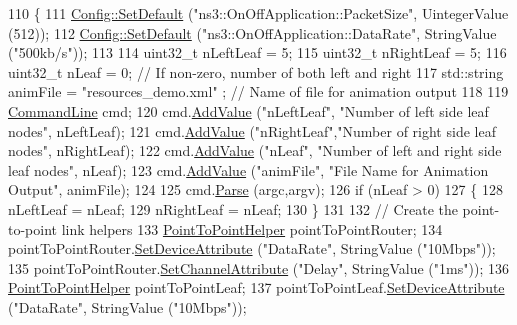 \begin{DoxyCode}
110 \{
111   \hyperlink{group__config_ga2e7882df849d8ba4aaad31c934c40c06}{Config::SetDefault} (\textcolor{stringliteral}{"ns3::OnOffApplication::PacketSize"}, UintegerValue (512));
112   \hyperlink{group__config_ga2e7882df849d8ba4aaad31c934c40c06}{Config::SetDefault} (\textcolor{stringliteral}{"ns3::OnOffApplication::DataRate"}, StringValue (\textcolor{stringliteral}{"500kb/s"}));
113 
114   uint32\_t    nLeftLeaf = 5;
115   uint32\_t    nRightLeaf = 5;
116   uint32\_t    nLeaf = 0; \textcolor{comment}{// If non-zero, number of both left and right}
117   std::string animFile = \textcolor{stringliteral}{"resources\_demo.xml"} ;  \textcolor{comment}{// Name of file for animation output}
118 
119   \hyperlink{classns3_1_1CommandLine}{CommandLine} cmd;
120   cmd.\hyperlink{classns3_1_1CommandLine_addcfb546c7ad4c8bd0965654d55beb8e}{AddValue} (\textcolor{stringliteral}{"nLeftLeaf"}, \textcolor{stringliteral}{"Number of left side leaf nodes"}, nLeftLeaf);
121   cmd.\hyperlink{classns3_1_1CommandLine_addcfb546c7ad4c8bd0965654d55beb8e}{AddValue} (\textcolor{stringliteral}{"nRightLeaf"},\textcolor{stringliteral}{"Number of right side leaf nodes"}, nRightLeaf);
122   cmd.\hyperlink{classns3_1_1CommandLine_addcfb546c7ad4c8bd0965654d55beb8e}{AddValue} (\textcolor{stringliteral}{"nLeaf"},     \textcolor{stringliteral}{"Number of left and right side leaf nodes"}, nLeaf);
123   cmd.\hyperlink{classns3_1_1CommandLine_addcfb546c7ad4c8bd0965654d55beb8e}{AddValue} (\textcolor{stringliteral}{"animFile"},  \textcolor{stringliteral}{"File Name for Animation Output"}, animFile);
124 
125   cmd.\hyperlink{classns3_1_1CommandLine_a5c10b85b3207e5ecb48d907966923156}{Parse} (argc,argv);
126   \textcolor{keywordflow}{if} (nLeaf > 0)
127     \{
128       nLeftLeaf = nLeaf;
129       nRightLeaf = nLeaf;
130     \}
131 
132   \textcolor{comment}{// Create the point-to-point link helpers}
133   \hyperlink{classns3_1_1PointToPointHelper}{PointToPointHelper} pointToPointRouter;
134   pointToPointRouter.\hyperlink{classns3_1_1PointToPointHelper_a4577f5ab8c387e5528af2e0fbab1152e}{SetDeviceAttribute}  (\textcolor{stringliteral}{"DataRate"}, StringValue (\textcolor{stringliteral}{"10Mbps"}));
135   pointToPointRouter.\hyperlink{classns3_1_1PointToPointHelper_a6b5317fd17fb61e5a53f8d66a90b63b9}{SetChannelAttribute} (\textcolor{stringliteral}{"Delay"}, StringValue (\textcolor{stringliteral}{"1ms"}));
136   \hyperlink{classns3_1_1PointToPointHelper}{PointToPointHelper} pointToPointLeaf;
137   pointToPointLeaf.\hyperlink{classns3_1_1PointToPointHelper_a4577f5ab8c387e5528af2e0fbab1152e}{SetDeviceAttribute}    (\textcolor{stringliteral}{"DataRate"}, StringValue (\textcolor{stringliteral}{"10Mbps"}));

\end{DoxyCode}
